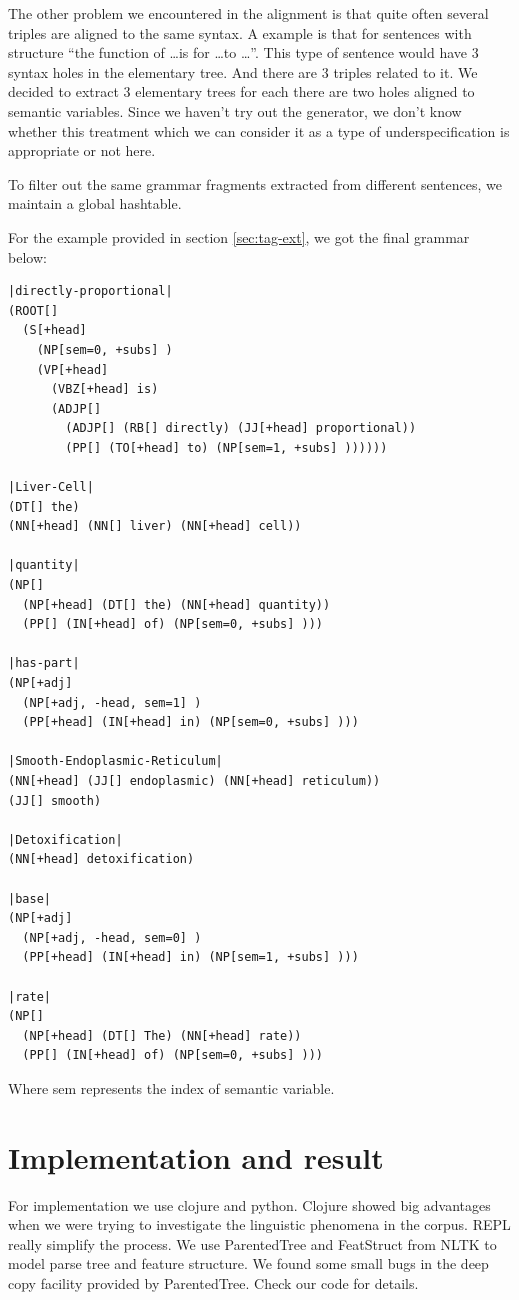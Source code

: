 \documentclass[a4paper]{article}
\begin{document}
The other problem we encountered in the alignment is that quite  often several triples are aligned to the same syntax. A example is that for sentences with structure ``the function of \ldots is for \ldots to \ldots''. This type of sentence would have 3 syntax holes in the elementary tree. And there are 3 triples related to it. We decided to extract 3 elementary trees for each there are two holes aligned to semantic variables. Since we haven't try out the generator, we don't know whether this treatment which we can consider it as a type of underspecification is appropriate or not here.

To filter out the same grammar fragments extracted from different sentences, we maintain a global hashtable.

For the example provided in section \ref{sec:tag-ext}, we got the final grammar below:

\begin{verbatim}
|directly-proportional|
(ROOT[]
  (S[+head]
    (NP[sem=0, +subs] )
    (VP[+head]
      (VBZ[+head] is)
      (ADJP[]
        (ADJP[] (RB[] directly) (JJ[+head] proportional))
        (PP[] (TO[+head] to) (NP[sem=1, +subs] ))))))

|Liver-Cell|
(DT[] the)
(NN[+head] (NN[] liver) (NN[+head] cell))

|quantity|
(NP[]
  (NP[+head] (DT[] the) (NN[+head] quantity))
  (PP[] (IN[+head] of) (NP[sem=0, +subs] )))

|has-part|
(NP[+adj]
  (NP[+adj, -head, sem=1] )
  (PP[+head] (IN[+head] in) (NP[sem=0, +subs] )))

|Smooth-Endoplasmic-Reticulum|
(NN[+head] (JJ[] endoplasmic) (NN[+head] reticulum))
(JJ[] smooth)

|Detoxification|
(NN[+head] detoxification)

|base|
(NP[+adj]
  (NP[+adj, -head, sem=0] )
  (PP[+head] (IN[+head] in) (NP[sem=1, +subs] )))

|rate|
(NP[]
  (NP[+head] (DT[] The) (NN[+head] rate))
  (PP[] (IN[+head] of) (NP[sem=0, +subs] )))
\end{verbatim}
Where sem represents the index of semantic variable.

\section{Implementation and result}
For implementation we use clojure and python. Clojure showed big advantages when we were trying to investigate the linguistic phenomena in the corpus. REPL really simplify the process. 
We use ParentedTree and FeatStruct from NLTK to model parse tree and feature structure. We found some small bugs in the deep copy facility provided by ParentedTree. Check our code for details.
\end{document}
